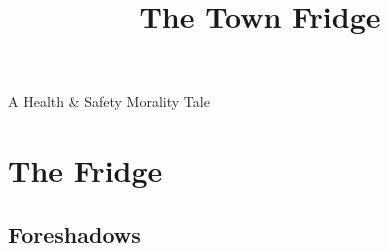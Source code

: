 \documentclass[a4paper,openany]{book}
\title{The Town Fridge}
\begin{document}
%
  {A Health \& Safety Morality Tale}%

\glsunsetall


\printglossary[
  style=topicmcols,
  ]

\printglossary[
  type=mech,
  style=topicmcols,
  ]

\mainmatter
\glsresetall

\chapter{The Fridge}

\section{Foreshadows}

\begin{multicols}{2}
  
\end{multicols}

\stopcontents[segments]



\backmatter
\end{document}
